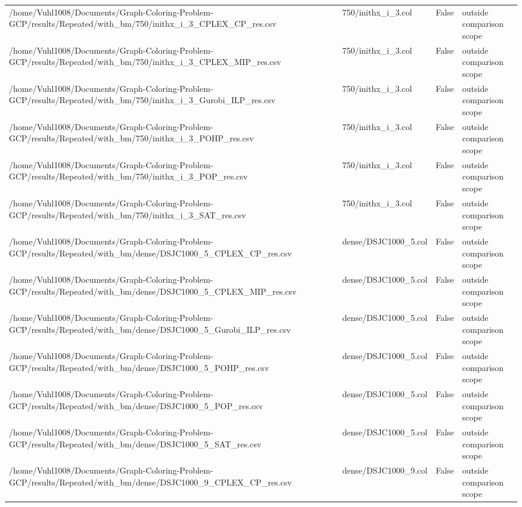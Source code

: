 \begin{table}[htbp]
\begin{tabular}{llll}
/home/Vuhl1008/Documents/Graph-Coloring-Problem-GCP/results/Repeated/with\_bm/750/inithx\_i\_3\_CPLEX\_CP\_res.csv & 750/inithx\_i\_3.col & False & outside comparison scope \\
/home/Vuhl1008/Documents/Graph-Coloring-Problem-GCP/results/Repeated/with\_bm/750/inithx\_i\_3\_CPLEX\_MIP\_res.csv & 750/inithx\_i\_3.col & False & outside comparison scope \\
/home/Vuhl1008/Documents/Graph-Coloring-Problem-GCP/results/Repeated/with\_bm/750/inithx\_i\_3\_Gurobi\_ILP\_res.csv & 750/inithx\_i\_3.col & False & outside comparison scope \\
/home/Vuhl1008/Documents/Graph-Coloring-Problem-GCP/results/Repeated/with\_bm/750/inithx\_i\_3\_POHP\_res.csv & 750/inithx\_i\_3.col & False & outside comparison scope \\
/home/Vuhl1008/Documents/Graph-Coloring-Problem-GCP/results/Repeated/with\_bm/750/inithx\_i\_3\_POP\_res.csv & 750/inithx\_i\_3.col & False & outside comparison scope \\
/home/Vuhl1008/Documents/Graph-Coloring-Problem-GCP/results/Repeated/with\_bm/750/inithx\_i\_3\_SAT\_res.csv & 750/inithx\_i\_3.col & False & outside comparison scope \\
/home/Vuhl1008/Documents/Graph-Coloring-Problem-GCP/results/Repeated/with\_bm/dense/DSJC1000\_5\_CPLEX\_CP\_res.csv & dense/DSJC1000\_5.col & False & outside comparison scope \\
/home/Vuhl1008/Documents/Graph-Coloring-Problem-GCP/results/Repeated/with\_bm/dense/DSJC1000\_5\_CPLEX\_MIP\_res.csv & dense/DSJC1000\_5.col & False & outside comparison scope \\
/home/Vuhl1008/Documents/Graph-Coloring-Problem-GCP/results/Repeated/with\_bm/dense/DSJC1000\_5\_Gurobi\_ILP\_res.csv & dense/DSJC1000\_5.col & False & outside comparison scope \\
/home/Vuhl1008/Documents/Graph-Coloring-Problem-GCP/results/Repeated/with\_bm/dense/DSJC1000\_5\_POHP\_res.csv & dense/DSJC1000\_5.col & False & outside comparison scope \\
/home/Vuhl1008/Documents/Graph-Coloring-Problem-GCP/results/Repeated/with\_bm/dense/DSJC1000\_5\_POP\_res.csv & dense/DSJC1000\_5.col & False & outside comparison scope \\
/home/Vuhl1008/Documents/Graph-Coloring-Problem-GCP/results/Repeated/with\_bm/dense/DSJC1000\_5\_SAT\_res.csv & dense/DSJC1000\_5.col & False & outside comparison scope \\
/home/Vuhl1008/Documents/Graph-Coloring-Problem-GCP/results/Repeated/with\_bm/dense/DSJC1000\_9\_CPLEX\_CP\_res.csv & dense/DSJC1000\_9.col & False & outside comparison scope \\

\end{tabular}
\end{table}
